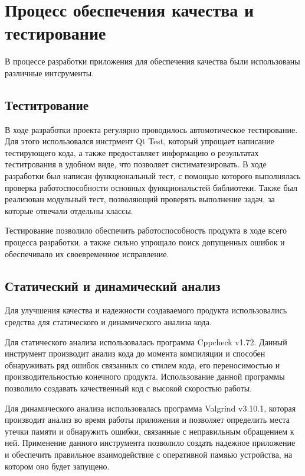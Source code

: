 \section{Процесс обеспечения качества и тестирование}

В процессе разработки приложения для обеспечения качества были использованы различные интсрументы.

\subsection{Теститрование}

В ходе разработки проекта регулярно проводилось автомотическое тестирование. Для этого использовался инстрмент Qt Test, который упрощает написание тестирующего кода, а также предоставляет информацию о результатах теститрования в удобном виде, что позволяет систиматезировать. В ходе разработки был написан функциональный тест, с помощью которого выполнялась проверка работоспособности основных функциональстей библиотеки. Также был реализован модульный тест, позволяющий проверять выполнение задач, за которые отвечали отдельны классы.

Тестирование позволило обеспечить работоспособность продукта в ходе всего процесса разработки, а также сильно упрощало поиск допущенных ошибок и обеспечивало их своевременное исправление.   

\subsection{Статический и динамический анализ}

Для улучшения качества и надежности создаваемого продукта использовались средства для статического и динамического анализа кода.

Для статического анализа использовалась программа Cppcheck v1.72. Данный инструмент производит анализ кода до момента компиляции и способен обнаруживать ряд ошибок связанных со стилем кода, его переносимостью и производительностью конечного продукта. Использование данной программы позволило создавать качественный код с высокой скоростью работы.

Для динамического анализа использовалась программа Valgrind v3.10.1, которая производит анализ во время работы приложения и позволяет определить места утечки памяти и обнаружить ошибки, связанные с неправильным обращением к ней. Применение данного инструмента позволило создать надежное приложение и обеспечить правильное взаимодействие с оперативной памяью устройства, на котором оно будет запущено.

